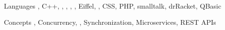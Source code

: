 

\begin{cvskills}

\cvskill
  {Languages} %
  {, C++, , , , , Eiffel, , CSS, PHP, smalltalk, drRacket, QBasic} %

\cvskill
  {Concepts} %
  {, Concurrency, , Synchronization, Microservices, REST APIs} %

\end{cvskills}
